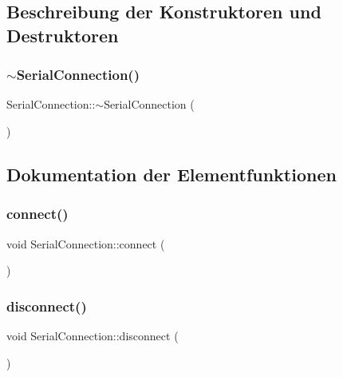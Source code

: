 \subsection{Beschreibung der Konstruktoren und Destruktoren}
\mbox{\label{class_serial_connection_ae73749bb08c2f53f467809cb6c0a3fc8}} 
\subsubsection{$\sim$\+Serial\+Connection()}
{\footnotesize\ttfamily Serial\+Connection\+::$\sim$\+Serial\+Connection (\begin{DoxyParamCaption}{ }\end{DoxyParamCaption})\hspace{0.3cm}{\ttfamily [virtual]}}



\subsection{Dokumentation der Elementfunktionen}
\mbox{\label{class_serial_connection_a6b1e786b3d6cc46d744f780284f24402}} 
\subsubsection{connect()}
{\footnotesize\ttfamily void Serial\+Connection\+::connect (\begin{DoxyParamCaption}{ }\end{DoxyParamCaption})}

\mbox{\label{class_serial_connection_a395259938f38535125f070b8ac00719d}} 
\subsubsection{disconnect()}
{\footnotesize\ttfamily void Serial\+Connection\+::disconnect (\begin{DoxyParamCaption}{ }\end{DoxyParamCaption})}

\mbox{\label{class_serial_connection_a85bda71650f96501c4142347d2fd45ea}} 
